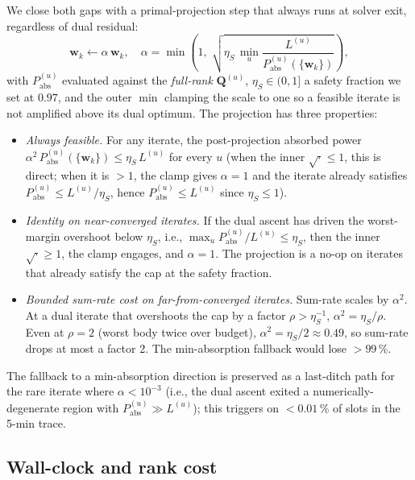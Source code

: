 \documentclass[journal,twocolumn,10pt]{IEEEtran}
\theoremstyle{plain}
\theoremstyle{remark}
\newcommand{\ww}{\mathbf{w}}
\newcommand{\Pabs}{P_{\mathrm{abs}}}
\newcommand{\Qmat}{\mathbf{Q}}
\begin{document}
We close both gaps with a primal-projection step that always runs
at solver exit, regardless of dual residual:
\begin{equation}\label{eq:primal-projection}
  \ww_k \leftarrow \alpha\,\ww_k,
  \quad
  \alpha = \min\!\left(1,\;
    \sqrt{\eta_S\,\min_u \frac{L^{(u)}}{\Pabs^{(u)}(\{\ww_k\})}}
  \right),
\end{equation}
with $\Pabs^{(u)}$ evaluated against the \emph{full-rank} $\Qmat^{(u)}$,
$\eta_S \in (0, 1]$ a safety fraction we set at $0.97$, and the
outer $\min$ clamping the scale to one so a feasible iterate is
not amplified above its dual optimum. The projection has three
properties:

\begin{itemize}
\item \emph{Always feasible.} For any iterate, the post-projection
  absorbed power $\alpha^2\,\Pabs^{(u)}(\{\ww_k\}) \leq \eta_S\,
  L^{(u)}$ for every $u$ (when the inner $\sqrt{\cdot} \leq 1$,
  this is direct; when it is $> 1$, the clamp gives $\alpha = 1$
  and the iterate already satisfies $\Pabs^{(u)} \leq L^{(u)}/\eta_S$,
  hence $\Pabs^{(u)} \leq L^{(u)}$ since $\eta_S \leq 1$).
\item \emph{Identity on near-converged iterates.} If the dual ascent
  has driven the worst-margin overshoot below $\eta_S$, i.e.,
  $\max_u \Pabs^{(u)}/L^{(u)} \leq \eta_S$, then the inner
  $\sqrt{\cdot} \geq 1$, the clamp engages, and $\alpha = 1$. The
  projection is a no-op on iterates that already satisfy the cap
  at the safety fraction.
\item \emph{Bounded sum-rate cost on far-from-converged iterates.}
  Sum-rate scales by $\alpha^2$. At a dual iterate that overshoots
  the cap by a factor $\rho > \eta_S^{-1}$, $\alpha^2 = \eta_S/\rho$.
  Even at $\rho = 2$ (worst body twice over budget),
  $\alpha^2 = \eta_S/2 \approx 0.49$, so sum-rate drops at most a
  factor 2. The min-absorption fallback would lose $> 99\,\%$.
\end{itemize}

The fallback to a min-absorption direction is preserved as a
last-ditch path for the rare iterate where $\alpha < 10^{-3}$
(i.e., the dual ascent exited a numerically-degenerate region with
$\Pabs^{(u)} \gg L^{(u)}$); this triggers on $< 0.01\,\%$ of slots
in the 5-min trace.

\subsection{Wall-clock and rank cost}\label{sec:wallclock}
\end{document}

